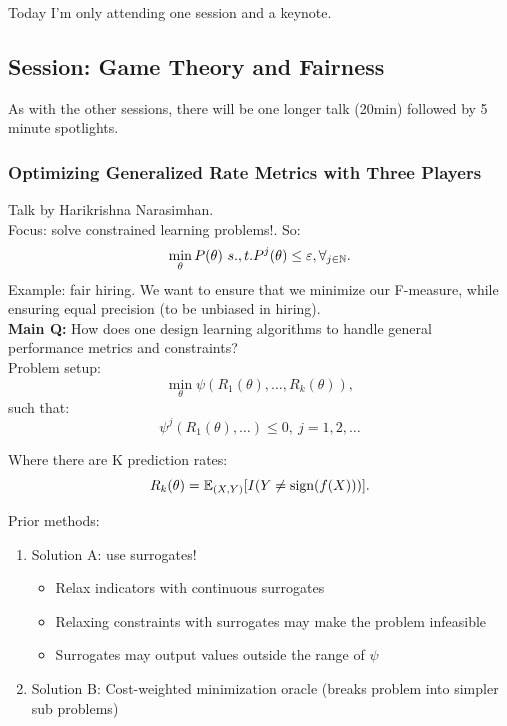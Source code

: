 Today I'm only attending one session and a keynote.

\subsection{Session: Game Theory and Fairness}

As with the other sessions, there will be one longer talk (20min) followed by 5 minute spotlights.

\subsubsection{Optimizing Generalized Rate Metrics with Three Players \cite{narasimhan2019optimizing}}

Talk by Harikrishna Narasimhan. \\

Focus: solve constrained learning problems!. So:
\[
\min_\theta P(\theta)\ s.,t. P^j(\theta) \leq \varepsilon, \forall_{j \in \mathbb{N}}.
\]
Example: fair hiring. We want to ensure that we minimize our F-measure, while ensuring equal precision (to be unbiased in hiring). \\

{\bf Main Q:} How does one design learning algorithms to handle general performance metrics and constraints? \\

Problem setup:
\[
\min_\theta \psi(R_1(\theta), \ldots, R_k(\theta)),
\]
such that:
\[
\psi^j(R_1(\theta), \ldots) \leq 0,\ j =1, 2, \ldots
\]

Where there are K prediction rates:
\[
R_k(\theta) = \mathbb{E}_{(X,Y)}[I(Y \neq \text{sign}(f(X)))].
\]

Prior methods:
\begin{enumerate}
    \item Solution A: use surrogates!
    \begin{itemize}
        \item Relax indicators with continuous surrogates
        \item Relaxing constraints with surrogates may make the problem infeasible
        \item Surrogates may output values outside the range of $\psi$
    \end{itemize}
    \item Solution B: Cost-weighted minimization oracle (breaks problem into simpler sub problems)
\end{enumerate}

